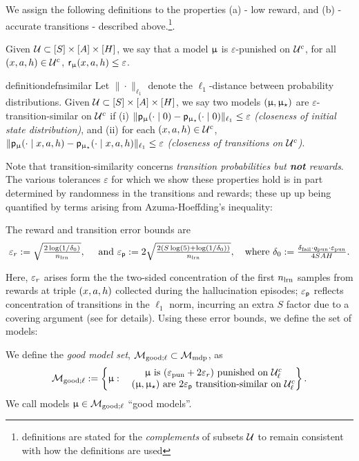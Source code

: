We assign the following definitions to the properties (a) - low reward,  and (b) - accurate transitions - described above.\footnote{definitions are stated for the \emph{complements} of subsets $\mathcal{U}$ to remain consistent with how the definitions are used}.
\begin{definition}[Punished] Given $\mathcal{U} \subset [S] \times [A] \times [H]$, we say that a model $\upmu$ is $\varepsilon$-punished on $\mathcal{U}^c$, for all $(x,a,h) \in \mathcal{U}^c$, $\mathsf{r}_{\upmu}(x,a,h) \le \varepsilon$.
\end{definition}
\begin{restatable}{definition}{defnsimilar} \label{defn:similarity_transition} Let $\|\cdot\|_{\ell_1}$ denote the $\ell_1$-distance between probability distributions.  Given $\mathcal{U} \subset [S] \times [A] \times [H]$, we say two models $(\upmu,\upmu_{\star})$ are $\varepsilon$-transition-similar on $\mathcal{U}^c$ if (i) $\|\mathsf{p}_{\upmu}(\cdot \mid 0 ) - \mathsf{p}_{\upmu_{\star}}(\cdot \mid 0)\|_{\ell_1} \le \varepsilon $ \emph{(closeness of initial state distribution)}, and (ii) for each $(x,a,h) \in \mathcal{U}^c$, $\|\mathsf{p}_{\upmu}(\cdot \mid x,a,h) - \mathsf{p}_{\upmu_{\star}}(\cdot\mid x,a,h)\|_{\ell_1} \le \varepsilon$ \emph{(closeness of transitions on $\mathcal{U}^c$)}.
\end{restatable}
 Note that transition-similarity concerns \emph{transition probabilities but \textbf{not} rewards}.
The various tolerances $\varepsilon$ for which we show these properties hold is in part determined by randomness in the transitions and rewards; these up up being quantified by terms arising from Azuma-Hoeffding's inequality:
\begin{definition}\label{defn:error_bounds} The reward and transition error bounds are
\begin{align}
\textstyle \varepsilon_{r} := \sqrt{ \frac{2\log(1/\delta_0)}{n_{\mathrm{lrn}}}}, \quad \text{ and } \varepsilon_{\mathsf{p}}:= 2\sqrt{ \frac{2(S\log(5) + \log(1/\delta_0))}{n_{\mathrm{lrn}}}}, \quad \text{where } \delta_0 := \frac{\delta_{\mathrm{fail}} \cdot q_{\mathrm{pun}} \cdot \varepsilon_{\mathrm{pun}}}{4SAH}.  \label{eq:delta_not}
\end{align}
\end{definition}
Here, $\varepsilon_{r}$ arises form the the two-sided concentration of the first $n_{\mathrm{lrn}}$ samples from rewards at triple $(x,a,h)$ collected during the hallucination episodes; $\varepsilon_{\mathsf{p}}$ reflects concentration of transitions in the $\ell_1$ norm, incurring an extra $S$ factor due to a covering argument (see  for details). Using these error bounds, we define the set of models:
\begin{definition} We define the \emph{good model set}, $\mathcal{M}_{\mathrm{good};\ell} \subset \mathcal{M}_{\mathrm{mdp}}$, as
\begin{align}
\mathcal{M}_{\mathrm{good};\ell} := \left\{\upmu: \begin{matrix} &\upmu \text{ is } (\varepsilon_{\mathrm{pun}} + 2\varepsilon_{r}) \text{ punished  on } \mathcal{U}_{\ell}^c \\
&(\upmu,\upmu_{\star}) \text{ are } 2\varepsilon_{\mathsf{p}} \text{ transition-similar on } \mathcal{U}_{\ell}^c\end{matrix}   \right\}. \label{eq:modgoodl_a}
\end{align}
We call models $\upmu \in \mathcal{M}_{\mathrm{good};\ell}$ ``good models''.
\end{definition}

